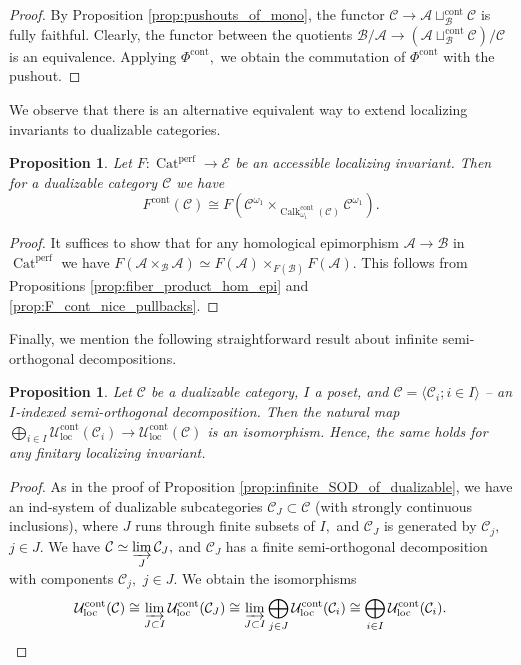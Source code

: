 \documentclass[11pt,leqno]{amsart}
\newtheorem{prop}[theo]{Proposition}
\numberwithin{equation}{section}
\newcommand{\indlim}[1][]{\mathop{\varinjlim}\limits_{#1}}
\newcommand{\biggplus}[1][]{\mathop{\bigoplus}\limits_{#1}}
\newcommand{\Cat}{\operatorname{Cat}}
\newcommand{\loc}{\operatorname{loc}}
\newcommand{\cont}{\operatorname{cont}}
\newcommand{\cA}{{\mathcal A}}
\newcommand{\cB}{{\mathcal B}}
\newcommand{\cC}{{\mathcal C}}
\newcommand{\cE}{{\mathcal E}}
\newcommand{\cU}{{\mathcal U}}
\newcommand{\perf}{\operatorname{perf}}
\newcommand{\Calk}{\operatorname{Calk}}
\begin{document}
\begin{proof}By Proposition \ref{prop:pushouts_of_mono}, the functor $\cC\to \cA\sqcup_{\cB}^{\cont}\cC$ is fully faithful. Clearly, the functor between the quotients $\cB/\cA\to (\cA\sqcup_{\cB}^{\cont}\cC)/\cC$ is an equivalence. Applying $\Phi^{\cont},$ we obtain the commutation of $\Phi^{\cont}$ with the pushout.\end{proof}

We observe that there is an alternative equivalent way to extend localizing invariants to dualizable categories.

\begin{prop}\label{prop:F_cont_hom_epi} Let $F:\Cat^{\perf}\to\cE$ be an accessible localizing invariant. Then for a dualizable category $\cC$ we have
$$F^{\cont}(\cC)\cong F(\cC^{\omega_1}\times_{\Calk_{\omega_1}^{\cont}(\cC)}\cC^{\omega_1}).$$\end{prop}

\begin{proof}It suffices to show that for any homological epimorphism $\cA\to\cB$ in $\Cat^{\perf}$ we have $F(\cA\times_{\cB}\cA)\simeq F(\cA)\times_{F(\cB)}F(\cA).$ This follows from Propositions \ref{prop:fiber_product_hom_epi} and \ref{prop:F_cont_nice_pullbacks}.\end{proof}

Finally, we mention the following straightforward result about infinite semi-orthogonal decompositions.

\begin{prop}\label{prop:additivity_in_infinite_SOD} Let $\cC$ be a dualizable category, $I$ a poset, and $\cC=\langle\cC_i;i\in I\rangle$ -- an $I$-indexed semi-orthogonal decomposition. Then the natural map $\biggplus[i\in I]\cU_{\loc}^{\cont}(\cC_i)\to \cU_{\loc}^{\cont}(\cC)$ is an isomorphism. Hence, the same holds for any finitary localizing invariant.\end{prop}

\begin{proof}As in the proof of Proposition \ref{prop:infinite_SOD_of_dualizable}, we have an ind-system of dualizable subcategories $\cC_J\subset\cC$ (with strongly continuous inclusions), where $J$ runs through finite subsets of $I,$ and $\cC_J$ is generated by $\cC_j,$ $j\in J.$ We have $\cC\simeq\indlim[J]\cC_J,$ and $\cC_J$ has a finite semi-orthogonal decomposition with components $\cC_j,$ $j\in J.$ We obtain the isomorphisms
\begin{equation*}\cU_{\loc}^{\cont}(\cC)\cong \indlim[J\subset I]\cU_{\loc}^{\cont}(\cC_J)\cong \indlim[J\subset I]\bigoplus_{j\in J}\cU_{\loc}^{\cont}(\cC_i)\cong \bigoplus_{i\in I} \cU_{\loc}^{\cont}(\cC_i).\qedhere\end{equation*}\end{proof}
\end{document}
